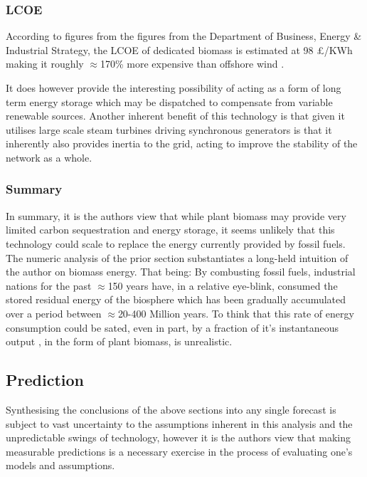 \documentclass[11pt]{article}
\numberwithin{equation}{section}
\begin{document}
\subsubsection{LCOE}
\label{sec:org04475f6}
According to figures from the figures from the Department of Business, Energy \& Industrial Strategy, the LCOE of dedicated biomass is estimated at 98 £/KWh making it roughly \(\approx\)170\% more expensive than offshore wind \cite{DeptEnerLCOE}.

It does however provide the interesting possibility of acting as a form of long term energy storage which may be dispatched to compensate from variable renewable sources. Another inherent benefit of this technology is that given it utilises large scale steam turbines driving synchronous generators is that it inherently also provides inertia to the grid, acting to improve the stability of the network as a whole.

\subsubsection{Summary}
\label{sec:orgd740c94}
In summary, it is the authors view that while plant biomass may provide very limited carbon sequestration and energy storage, it seems unlikely that this technology could scale to replace the energy currently provided by fossil fuels. The numeric analysis of the prior section substantiates a long-held intuition of the author on biomass energy. That being: By combusting fossil fuels, industrial nations for the past \(\approx\)150 years have, in a relative eye-blink, consumed the stored residual energy of the biosphere which has been gradually accumulated over a period between \(\approx\)20-400 Million years. To think that this rate of energy consumption could be sated, even in part, by a fraction of it's instantaneous output , in the form of plant biomass, is unrealistic.
\subsection{Prediction}
\label{sec:org070c410}
Synthesising the conclusions of the above sections into any single forecast is subject to vast uncertainty to the assumptions inherent in this analysis and the unpredictable swings of technology, however it is the authors view that making measurable predictions is a necessary exercise in the process of evaluating one's models and assumptions.
\end{document}
